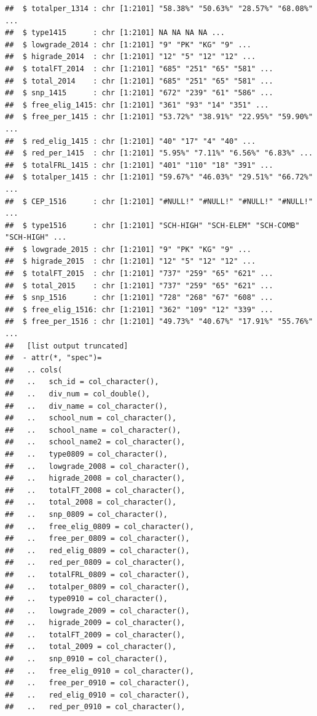 \documentclass[
]{book}
\begin{document}
\begin{verbatim}
##  $ totalper_1314 : chr [1:2101] "58.38%" "50.63%" "28.57%" "68.08%" ...
##  $ type1415      : chr [1:2101] NA NA NA NA ...
##  $ lowgrade_2014 : chr [1:2101] "9" "PK" "KG" "9" ...
##  $ higrade_2014  : chr [1:2101] "12" "5" "12" "12" ...
##  $ totalFT_2014  : chr [1:2101] "685" "251" "65" "581" ...
##  $ total_2014    : chr [1:2101] "685" "251" "65" "581" ...
##  $ snp_1415      : chr [1:2101] "672" "239" "61" "586" ...
##  $ free_elig_1415: chr [1:2101] "361" "93" "14" "351" ...
##  $ free_per_1415 : chr [1:2101] "53.72%" "38.91%" "22.95%" "59.90%" ...
##  $ red_elig_1415 : chr [1:2101] "40" "17" "4" "40" ...
##  $ red_per_1415  : chr [1:2101] "5.95%" "7.11%" "6.56%" "6.83%" ...
##  $ totalFRL_1415 : chr [1:2101] "401" "110" "18" "391" ...
##  $ totalper_1415 : chr [1:2101] "59.67%" "46.03%" "29.51%" "66.72%" ...
##  $ CEP_1516      : chr [1:2101] "#NULL!" "#NULL!" "#NULL!" "#NULL!" ...
##  $ type1516      : chr [1:2101] "SCH-HIGH" "SCH-ELEM" "SCH-COMB" "SCH-HIGH" ...
##  $ lowgrade_2015 : chr [1:2101] "9" "PK" "KG" "9" ...
##  $ higrade_2015  : chr [1:2101] "12" "5" "12" "12" ...
##  $ totalFT_2015  : chr [1:2101] "737" "259" "65" "621" ...
##  $ total_2015    : chr [1:2101] "737" "259" "65" "621" ...
##  $ snp_1516      : chr [1:2101] "728" "268" "67" "608" ...
##  $ free_elig_1516: chr [1:2101] "362" "109" "12" "339" ...
##  $ free_per_1516 : chr [1:2101] "49.73%" "40.67%" "17.91%" "55.76%" ...
##   [list output truncated]
##  - attr(*, "spec")=
##   .. cols(
##   ..   sch_id = col_character(),
##   ..   div_num = col_double(),
##   ..   div_name = col_character(),
##   ..   school_num = col_character(),
##   ..   school_name = col_character(),
##   ..   school_name2 = col_character(),
##   ..   type0809 = col_character(),
##   ..   lowgrade_2008 = col_character(),
##   ..   higrade_2008 = col_character(),
##   ..   totalFT_2008 = col_character(),
##   ..   total_2008 = col_character(),
##   ..   snp_0809 = col_character(),
##   ..   free_elig_0809 = col_character(),
##   ..   free_per_0809 = col_character(),
##   ..   red_elig_0809 = col_character(),
##   ..   red_per_0809 = col_character(),
##   ..   totalFRL_0809 = col_character(),
##   ..   totalper_0809 = col_character(),
##   ..   type0910 = col_character(),
##   ..   lowgrade_2009 = col_character(),
##   ..   higrade_2009 = col_character(),
##   ..   totalFT_2009 = col_character(),
##   ..   total_2009 = col_character(),
##   ..   snp_0910 = col_character(),
##   ..   free_elig_0910 = col_character(),
##   ..   free_per_0910 = col_character(),
##   ..   red_elig_0910 = col_character(),
##   ..   red_per_0910 = col_character(),

\end{verbatim}
\end{document}
